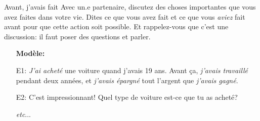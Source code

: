 \begin{frame}{Avant, j'avais fait}
  Avec un.e partenaire, discutez des choses importantes que vous avez faites dans votre vie.
  Dites ce que vous avez fait \alert{et} ce que vous \emph{aviez} fait avant pour que cette action soit possible.
  Et rappelez-vous que c'est une discussion: il faut poser des questions et parler.
  \begin{itemize}
    \item[] \textbf{Modèle:}
    \item[E1:] \emph{J'ai acheté} une voiture quand j'avais 19 ans. Avant ça, \emph{j'avais travaillé} pendant deux années, et \emph{j'avais épargné} tout l'argent que \emph{j'avais gagné}.
    \item[E2:] C'est impressionnant! Quel type de voiture est-ce que tu as acheté?
    \item[] \emph{etc}...
  \end{itemize}
\end{frame}